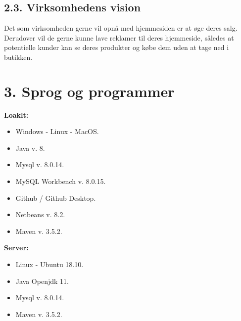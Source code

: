 \documentclass[11pt]{report}
\begin{document}
\section*{2.3. Virksomhedens vision}
Det som virksomheden gerne vil opnå med hjemmesiden er at øge deres salg. Derudover vil de gerne kunne lave reklamer til deres hjemmeside, således at potentielle kunder kan se deres produkter og købe dem uden at tage ned i butikken.
\newpage

\chapter*{3. Sprog og programmer}
\textbf{Loaklt:}
\begin{itemize}
  \item Windows - Linux - MacOS.
  \item Java v. 8.
  \item Mysql v. 8.0.14.
  \item MySQL Workbench v. 8.0.15.
  \item Github / Github Desktop.
  \item Netbeans v. 8.2.
  \item Maven v. 3.5.2.
\end{itemize}
\textbf{Server:}
\begin{itemize}
  \item Linux - Ubuntu 18.10.
  \item Java Openjdk 11.
  \item Mysql v. 8.0.14.
  \item Maven v. 3.5.2.
\end{itemize}
\newpage
\end{document}
